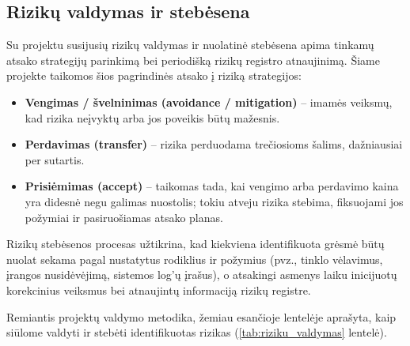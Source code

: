\subsection{Rizikų valdymas ir stebėsena}
Su projektu susijusių rizikų valdymas ir nuolatinė stebėsena apima tinkamų atsako strategijų parinkimą bei periodišką rizikų registro atnaujinimą. Šiame projekte taikomos šios pagrindinės atsako į riziką strategijos:
\begin{itemize}
    \item \textbf{Vengimas / švelninimas (avoidance / mitigation)} -- imamės veiksmų, kad rizika neįvyktų arba jos poveikis būtų mažesnis.
    \item \textbf{Perdavimas (transfer)} -- rizika perduodama trečiosioms šalims, dažniausiai per sutartis.
    \item \textbf{Prisiėmimas (accept)} -- taikomas tada, kai vengimo arba perdavimo kaina yra didesnė negu galimas nuostolis; tokiu atveju rizika stebima, fiksuojami jos požymiai ir pasiruošiamas atsako planas.
\end{itemize}

Rizikų stebėsenos procesas užtikrina, kad kiekviena identifikuota grėsmė būtų nuolat sekama pagal nustatytus rodiklius ir požymius (pvz., tinklo vėlavimus, įrangos nusidėvėjimą, sistemos log'ų įrašus), o atsakingi asmenys laiku inicijuotų korekcinius veiksmus bei atnaujintų informaciją rizikų registre.

Remiantis projektų valdymo metodika, žemiau esančioje lentelėje aprašyta, kaip siūlome valdyti ir stebėti identifikuotas rizikas (\ref{tab:riziku_valdymas} lentelė).

